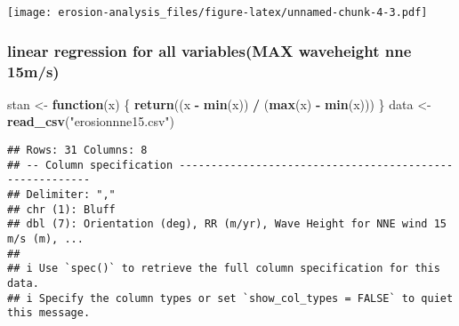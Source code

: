 \documentclass[
]{article}
\newenvironment{Shaded}{\begin{snugshade}}{\end{snugshade}}
\newcommand{\AttributeTok}[1]{\textcolor[rgb]{0.13,0.29,0.53}{#1}}
\newcommand{\CommentTok}[1]{\textcolor[rgb]{0.56,0.35,0.01}{\textit{#1}}}
\newcommand{\ControlFlowTok}[1]{\textcolor[rgb]{0.13,0.29,0.53}{\textbf{#1}}}
\newcommand{\DecValTok}[1]{\textcolor[rgb]{0.00,0.00,0.81}{#1}}
\newcommand{\FunctionTok}[1]{\textcolor[rgb]{0.13,0.29,0.53}{\textbf{#1}}}
\newcommand{\NormalTok}[1]{#1}
\newcommand{\OtherTok}[1]{\textcolor[rgb]{0.56,0.35,0.01}{#1}}
\newcommand{\SpecialCharTok}[1]{\textcolor[rgb]{0.81,0.36,0.00}{\textbf{#1}}}
\newcommand{\StringTok}[1]{\textcolor[rgb]{0.31,0.60,0.02}{#1}}
\begin{document}
\begin{Shaded}
\end{Shaded}

\texttt{[image: erosion-analysis\_files/figure-latex/unnamed-chunk-4-3.pdf]}

\hypertarget{linear-regression-for-all-variablesmax-waveheight-nne-15ms}{%
\subsubsection{linear regression for all variables(MAX waveheight nne
15m/s)}\label{linear-regression-for-all-variablesmax-waveheight-nne-15ms}}

\begin{Shaded}
\begin{Highlighting}[]
\NormalTok{stan }\OtherTok{\textless{}{-}} \ControlFlowTok{function}\NormalTok{(x) \{}
  \FunctionTok{return}\NormalTok{((x }\SpecialCharTok{{-}} \FunctionTok{min}\NormalTok{(x)) }\SpecialCharTok{/}\NormalTok{ (}\FunctionTok{max}\NormalTok{(x) }\SpecialCharTok{{-}} \FunctionTok{min}\NormalTok{(x)))}
\NormalTok{\}}
\NormalTok{data }\OtherTok{\textless{}{-}} \FunctionTok{read\_csv}\NormalTok{(}\StringTok{"erosionnne15.csv"}\NormalTok{)}
\end{Highlighting}
\end{Shaded}

\begin{verbatim}
## Rows: 31 Columns: 8
## -- Column specification --------------------------------------------------------
## Delimiter: ","
## chr (1): Bluff
## dbl (7): Orientation (deg), RR (m/yr), Wave Height for NNE wind 15 m/s (m), ...
## 
## i Use `spec()` to retrieve the full column specification for this data.
## i Specify the column types or set `show_col_types = FALSE` to quiet this message.
\end{verbatim}
\end{document}
